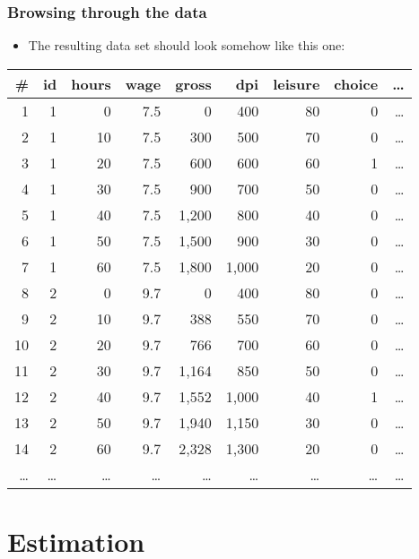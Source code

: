 \documentclass[handout,intlimits]{beamer}
\begin{document}
\begin{frame}
\frametitle{Browsing through the data}
\begin{itemize}
	\item The resulting data set should look somehow like this one:
\end{itemize}
\begin{table}[htbp]
	\centering\tiny
	\begin{threeparttable}
	\begin{tabular}{rrrrrrrrr}
	\toprule
	\textbf{\#} & \textbf{id} & \textbf{hours} & \textbf{wage} & \textbf{gross} & \textbf{dpi} & \textbf{leisure} & \textbf{choice} & \textbf{\dots} \\
	\midrule
	1	&	1	&	0	&	7.5	&	0	&	400	&	80	&	0	& \dots \\
	2	&	1	&	10	&	7.5	&	300	&	500	&	70	&	0	& \dots \\
	3	&	1	&	20	&	7.5	&	600	&	600	&	60	&	1	& \dots \\
	4	&	1	&	30	&	7.5	&	900	&	700	&	50	&	0	& \dots \\
	5	&	1	&	40	&	7.5	& 1,200	&	800	&	40	&	0	& \dots \\
	6	&	1	&	50	&	7.5	& 1,500	&	900	&	30	&	0	& \dots \\
	7	&	1	&	60	&	7.5	& 1,800	& 1,000	&	20	&	0	& \dots \\
	\midrule
	8	&	2	&	0	&	9.7	&	0	&	400	&	80	&	0	& \dots \\
	9	&	2	&	10	&	9.7	& 388	&	550	&	70	&	0	& \dots \\
	10	&	2	&	20	&	9.7	& 766	&	700	&	60	&	0	& \dots \\
	11	&	2	&	30	&	9.7	& 1,164	&	850	&	50	&	0	& \dots \\
	12	&	2	&	40	&	9.7	& 1,552	& 1,000	&	40	&	1	& \dots \\
	13	&	2	&	50	&	9.7	& 1,940	& 1,150	&	30	&	0	& \dots \\
	14	&	2	&	60	&	9.7	& 2,328	& 1,300	&	20	&	0	& \dots \\
	\midrule
	\dots	&	\dots	&	\dots	&	\dots	& \dots	& \dots	&	\dots	&	\dots& \dots \\
	\bottomrule
	\end{tabular}
	\end{threeparttable}
\end{table}
\end{frame}


\section{Estimation}
\end{document}

